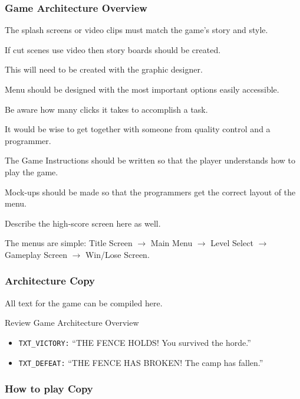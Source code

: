 \subsubsection{Game Architecture Overview}

\begin{guidance}
The splash screens or video clips must match the game’s story and style.

If cut scenes use video then story boards should be created.

This will need to be created with the graphic designer.

Menu should be designed with the most important options easily accessible.

Be aware how many clicks it takes to accomplish a task.

It would be wise to get together with someone from quality control and a programmer.

The Game Instructions should be written so that the player understands how to play the game.

Mock-ups should be made so that the programmers get the correct layout of the menu.

Describe the high-score screen here as well.
\end{guidance}
The menus are simple: Title Screen $\rightarrow$ Main Menu $\rightarrow$ Level Select $\rightarrow$ Gameplay Screen $\rightarrow$ Win/Lose Screen.

\subsubsection{Architecture Copy}

\begin{guidance}
All text for the game can be compiled here.

Review Game Architecture Overview
\end{guidance}
\begin{itemize}[label=\textbullet]
  \item \texttt{TXT\_VICTORY:} ``THE FENCE HOLDS! You survived the horde.''
  \item \texttt{TXT\_DEFEAT:} ``THE FENCE HAS BROKEN! The camp has fallen.''
\end{itemize}

\subsubsection{How to play Copy}

